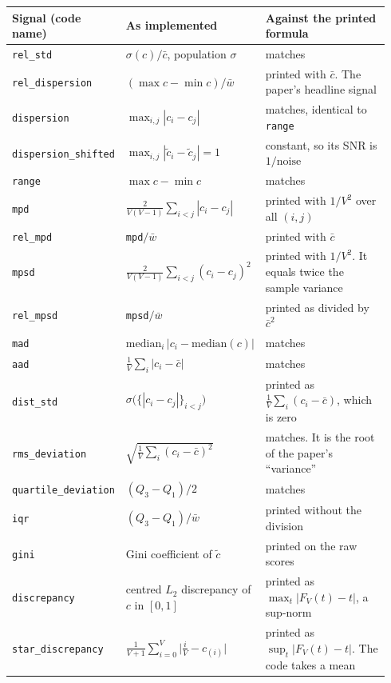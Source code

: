 \begin{table}[h]
\centering
\scriptsize
\begin{tabular}{@{}p{0.19\linewidth}p{0.36\linewidth}p{0.39\linewidth}@{}}
\toprule
\textbf{Signal (code name)} & \textbf{As implemented} & \textbf{Against the printed formula} \\
\midrule
\texttt{rel\_std} & $\sigma(c)/\bar{c}$, population $\sigma$ & matches \\
\texttt{rel\_dispersion} & $(\max c - \min c)/\bar{w}$ & printed with $\bar{c}$. The paper's headline signal \\
\texttt{dispersion} & $\max_{i,j}|c_i - c_j|$ & matches, identical to \texttt{range} \\
\texttt{dispersion\_shifted} & $\max_{i,j}|\tilde{c}_i - \tilde{c}_j| = 1$ & constant, so its SNR is $1/\text{noise}$ \\
\texttt{range} & $\max c - \min c$ & matches \\
\texttt{mpd} & $\frac{2}{V(V-1)}\sum_{i<j}|c_i - c_j|$ & printed with $1/V^2$ over all $(i,j)$ \\
\texttt{rel\_mpd} & \texttt{mpd}$/\bar{w}$ & printed with $\bar{c}$ \\
\texttt{mpsd} & $\frac{2}{V(V-1)}\sum_{i<j}(c_i - c_j)^2$ & printed with $1/V^2$. It equals twice the sample variance \\
\texttt{rel\_mpsd} & \texttt{mpsd}$/\bar{w}$ & printed as divided by $\bar{c}^2$ \\
\texttt{mad} & $\mathrm{median}_i\,|c_i - \mathrm{median}(c)|$ & matches \\
\texttt{aad} & $\frac{1}{V}\sum_i |c_i - \bar{c}|$ & matches \\
\texttt{dist\_std} & $\sigma\big(\{|c_i - c_j|\}_{i<j}\big)$ & printed as $\frac{1}{V}\sum_i (c_i - \bar{c})$, which is zero \\
\texttt{rms\_deviation} & $\sqrt{\frac{1}{V}\sum_i (c_i - \bar{c})^2}$ & matches. It is the root of the paper's ``variance'' \\
\texttt{quartile\_deviation} & $(Q_3 - Q_1)/2$ & matches \\
\texttt{iqr} & $(Q_3 - Q_1)/\bar{w}$ & printed without the division \\
\texttt{gini} & Gini coefficient of $\tilde{c}$ & printed on the raw scores \\
\texttt{discrepancy} & centred $L_2$ discrepancy of $c$ in $[0,1]$ & printed as $\max_t |F_V(t) - t|$, a sup-norm \\
\texttt{star\_discrepancy} & $\frac{1}{V+1}\sum_{i=0}^{V}\big|\tfrac{i}{V} - c_{(i)}\big|$ & printed as $\sup_t |F_V(t) - t|$. The code takes a mean \\

\end{tabular}
\end{table}

